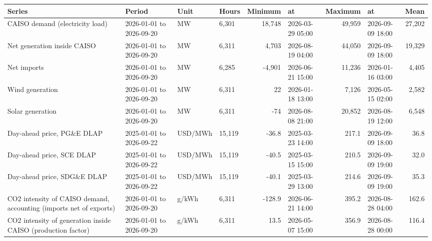 \begin{tabular}{llllrlrlr}
\toprule
Series & Period & Unit & Hours & Minimum & at & Maximum & at & Mean \\
\midrule
CAISO demand (electricity load) & 2026-01-01 to 2026-09-20 & MW & 6,301 & 18,748 & 2026-03-29 05:00 & 49,959 & 2026-09-09 18:00 & 27,202 \\
Net generation inside CAISO & 2026-01-01 to 2026-09-20 & MW & 6,311 & 4,703 & 2026-08-19 04:00 & 44,050 & 2026-09-09 18:00 & 19,329 \\
Net imports & 2026-01-01 to 2026-09-20 & MW & 6,285 & -4,901 & 2026-06-21 15:00 & 11,236 & 2026-01-16 03:00 & 4,405 \\
Wind generation & 2026-01-01 to 2026-09-20 & MW & 6,311 & 22 & 2026-01-18 13:00 & 7,126 & 2026-05-15 02:00 & 2,582 \\
Solar generation & 2026-01-01 to 2026-09-20 & MW & 6,311 & -74 & 2026-08-08 21:00 & 20,852 & 2026-08-19 12:00 & 6,548 \\
Day-ahead price, PG\&E DLAP & 2025-01-01 to 2026-09-22 & USD/MWh & 15,119 & -36.8 & 2025-03-23 14:00 & 217.1 & 2026-09-09 18:00 & 36.8 \\
Day-ahead price, SCE DLAP & 2025-01-01 to 2026-09-22 & USD/MWh & 15,119 & -40.5 & 2025-03-15 15:00 & 210.5 & 2026-09-09 19:00 & 32.0 \\
Day-ahead price, SDG\&E DLAP & 2025-01-01 to 2026-09-22 & USD/MWh & 15,119 & -40.1 & 2025-03-29 13:00 & 214.6 & 2026-09-09 19:00 & 35.3 \\
CO2 intensity of CAISO demand, accounting (imports net of exports) & 2026-01-01 to 2026-09-20 & g/kWh & 6,311 & -128.9 & 2026-06-21 14:00 & 395.2 & 2026-08-28 04:00 & 162.6 \\
CO2 intensity of generation inside CAISO (production factor) & 2026-01-01 to 2026-09-20 & g/kWh & 6,311 & 13.5 & 2026-05-07 15:00 & 356.9 & 2026-08-28 00:00 & 116.4 \\
\bottomrule
\end{tabular}